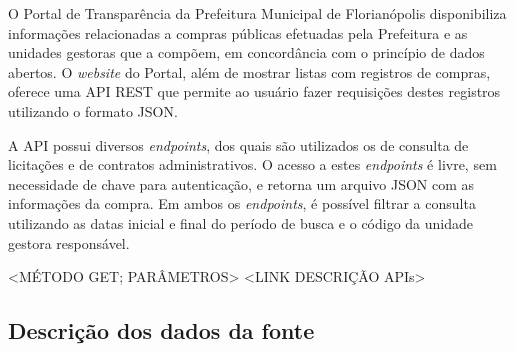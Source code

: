 O Portal de Transparência da Prefeitura Municipal de Florianópolis disponibiliza informações relacionadas a compras públicas efetuadas pela Prefeitura e as unidades gestoras que a compõem, em concordância com o princípio de dados abertos. O \textit{website} do Portal, além de mostrar listas com registros de compras, oferece uma API REST que permite ao usuário fazer requisições destes registros utilizando o formato JSON.

A API possui diversos \textit{endpoints}, dos quais são utilizados os de consulta de licitações e de contratos administrativos. O acesso a estes \textit{endpoints} é livre, sem necessidade de chave para autenticação, e retorna um arquivo JSON com as informações da compra. Em ambos os \textit{endpoints}, é possível filtrar a consulta utilizando as datas inicial e final do período de busca e o código da unidade gestora responsável.

<MÉTODO GET; PARÂMETROS>
<LINK DESCRIÇÃO APIs>

\subsection{Descrição dos dados da fonte}

